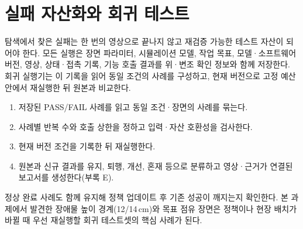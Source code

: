 \section{실패 자산화와 회귀 테스트}
탐색에서 찾은 실패는 한 번의 영상으로 끝나지 않고 재검증 가능한 테스트 자산이 되어야 한다.
모든 실행은 장면 파라미터, 시뮬레이션 모델, 작업 목표, 모델·소프트웨어 버전, 영상, 상태·접촉 기록,
기능 호출 결과를 위·변조 확인 정보와 함께 저장한다. 회귀 실행기는 이 기록을 읽어 동일
조건의 사례를 구성하고, 현재 버전으로 고정 예산 안에서 재실행한 뒤 원본과 비교한다.

\begin{enumerate}
\item 저장된 PASS/FAIL 사례를 읽고 동일 조건·장면의 사례를 묶는다.
\item 사례별 반복 수와 호출 상한을 정하고 입력·자산 호환성을 검사한다.
\item 현재 버전 조건을 기록한 뒤 재실행한다.
\item 원본과 신규 결과를 유지, 퇴행, 개선, 혼재 등으로 분류하고 영상·근거가 연결된 보고서를 생성한다(부록 E).
\end{enumerate}

정상 완료 사례도 함께 유지해 정책 업데이트 후 기존 성공이 깨지는지 확인한다. 본 과제에서 발견한
장애물 높이 경계(12/14\,cm)와 목표 점유 장면은 정책이나 현장 배치가 바뀔 때 우선 재실행할
회귀 테스트셋의 핵심 사례가 된다.
